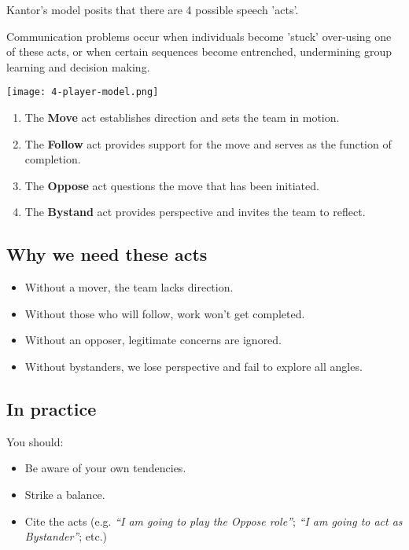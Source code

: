\documentclass{article}
\newenvironment{nosepitemize}
{ \begin{itemize}
    \setlength{\itemsep}{0pt}
    \setlength{\parskip}{0pt}
    \setlength{\parsep}{0pt}     }
{ \end{itemize}                  }
\newenvironment{nosepenumerate}
{ \begin{enumerate}
    \setlength{\itemsep}{0pt}
    \setlength{\parskip}{0pt}
    \setlength{\parsep}{0pt}     }
{ \end{enumerate}                  }
\begin{document}
\begin{multicols}{2}

\noindent
Kantor's model posits that there are 4 possible speech 'acts'.

Communication problems occur when individuals become 'stuck' over-using one of these acts, or when certain sequences become entrenched, undermining group learning and decision making.

\centerline{\texttt{[image: 4-player-model.png]}}

\begin{nosepenumerate}
    \item The \textbf{Move} act establishes direction and sets the team in motion.
    \item The \textbf{Follow} act provides support for the move and serves as the function of completion.
    \item The \textbf{Oppose} act questions the move that has been initiated.
    \item The \textbf{Bystand} act provides perspective and invites the team to reflect.
\end{nosepenumerate}

\subsection{Why we need these acts}

\begin{nosepitemize}
    \item Without a mover, the team lacks direction.
    \item Without those who will follow, work won’t get completed.
    \item Without an opposer, legitimate concerns are ignored.
    \item Without bystanders, we lose perspective and fail to explore all angles.
\end{nosepitemize}

\subsection{In practice}

You should:

\begin{nosepitemize}
    \item Be aware of your own tendencies.
    \item Strike a balance.
    \item Cite the acts (e.g. \textit{“I am going to play the Oppose role”}; \textit{“I am going to act as Bystander”}; etc.)
\end{nosepitemize}


\end{multicols}
\end{document}
